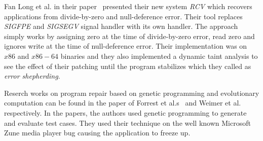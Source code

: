 Fan Long et al. in their paper~\cite{conf/pldi/LongSR14} presented their new
system \emph{RCV} which recovers applications from divide-by-zero and
null-deference error. Their tool replaces \emph{SIGFPE} and \emph{SIGSEGV}
signal handler with its own handler. The approach simply works by assigning zero
at the time of divide-by-zero error, read zero and ignores write at the time of
null-deference error. Their implementation was on $x86$ and $x86-64$ binaries
and they also implemented a dynamic taint analysis to see the effect of
their
patching until the program stabilizes which they called as \emph{error
shepherding}.

% 
Reserch works on program repair based on genetic programming and evolutionary
computation can be found in the paper of Forrest
et al.s~\cite{conf/gecco/2009g} and Weimer
et al.~\cite{DBLP:journals/cacm/WeimerFGN10} respectively. In the papers, the
authors used genetic programming to generate and evaluate test cases. They used their
technique on the well known Microsoft Zune media player bug causing the
application to freeze up.


